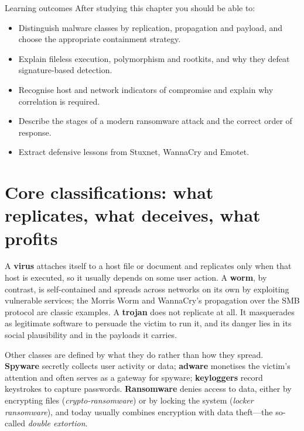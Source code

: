 \documentclass[11pt,openany]{book}
\begin{document}
\begin{outcomesbox}{Learning outcomes}
After studying this chapter you should be able to:
\begin{itemize}
  \item Distinguish malware classes by replication, propagation and payload, and choose the appropriate containment strategy.
  \item Explain fileless execution, polymorphism and rootkits, and why they defeat signature-based detection.
  \item Recognise host and network indicators of compromise and explain why correlation is required.
  \item Describe the stages of a modern ransomware attack and the correct order of response.
  \item Extract defensive lessons from Stuxnet, WannaCry and Emotet.
\end{itemize}
\end{outcomesbox}

\section{Core classifications: what replicates, what deceives, what profits}\label{sec:4.1}
A \textbf{virus} attaches itself to a host file or document and replicates only when that host is executed, so it usually depends on some user action. A \textbf{worm}, by contrast, is self-contained and spreads across networks on its own by exploiting vulnerable services; the Morris Worm and WannaCry's propagation over the SMB protocol are classic examples. A \textbf{trojan} does not replicate at all. It masquerades as legitimate software to persuade the victim to run it, and its danger lies in its social plausibility and in the payloads it carries.

Other classes are defined by what they do rather than how they spread. \textbf{Spyware} secretly collects user activity or data; \textbf{adware} monetises the victim's attention and often serves as a gateway for spyware; \textbf{keyloggers} record keystrokes to capture passwords. \textbf{Ransomware} denies access to data, either by encrypting files (\emph{crypto-ransomware}) or by locking the system (\emph{locker ransomware}), and today usually combines encryption with data theft—the so-called \emph{double extortion}.
\end{document}
